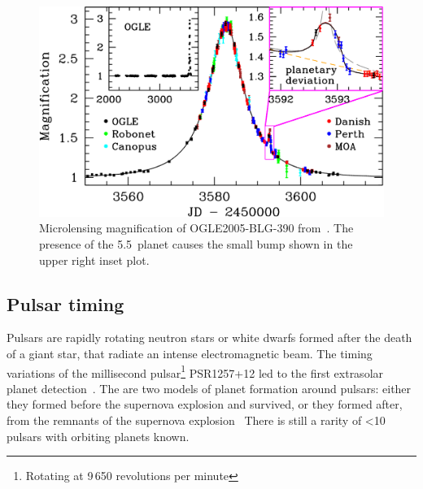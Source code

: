 \begin{figure}
    \centering
    \includegraphics[width=0.5\linewidth]{./figures/introduction/Microlensing_OGLE2005-BLG-390.pdf}
    \caption{Microlensing magnification of OGLE2005-BLG-390 from~\citep{beaulieu_discovery_2006}.
    The presence of the 5.5\,\Mjup{} planet causes the small bump shown in the upper right inset plot.}
    \label{fig:microlensing_example}
\end{figure}


\subsection{Pulsar timing}
\label{sub:pulsar_timing}
Pulsars are rapidly rotating neutron stars or white dwarfs formed after the death of a giant star, that radiate an intense electromagnetic beam.
The timing variations of the millisecond pulsar\footnote{Rotating at 9\,650 revolutions per minute} {PSR1257+12} led to the first extrasolar planet detection~\citet{wolszczan_planetary_1992}.
The are two models of planet formation around pulsars: either they formed before the supernova explosion and survived, or they formed after, from the remnants of the supernova explosion~\citep{Starovoit_existence_2017}
There is still a rarity of <10 pulsars with orbiting planets known.

